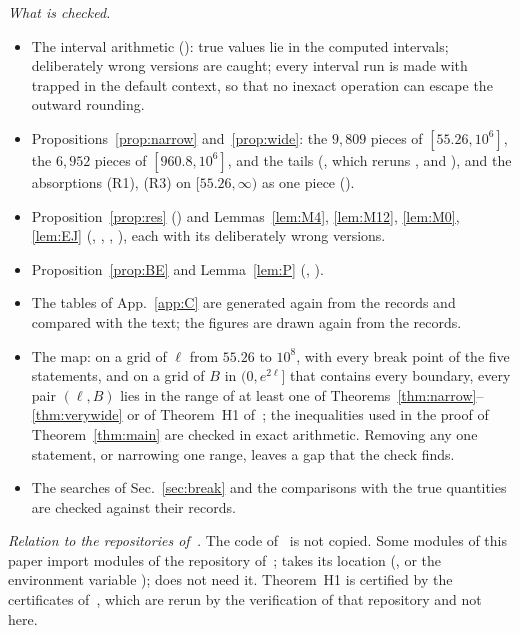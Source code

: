 \emph{What is checked.}
\begin{itemize}
\item[(i)] The interval arithmetic (): true values lie in the computed intervals; deliberately wrong versions are caught; every interval run is made with  trapped in the default context, so that no inexact operation can escape the outward rounding.
\item[(ii)] Propositions~\ref{prop:narrow} and~\ref{prop:wide}: the $9{,}809$ pieces of $[55.26,10^6]$, the $6{,}952$ pieces of $[960.8,10^6]$, and the tails (, which reruns ,  and ), and the absorptions (R1), (R3) on $[55.26,\infty)$ as one piece ().
\item[(iii)] Proposition~\ref{prop:res} () and Lemmas~\ref{lem:M4}, \ref{lem:M12}, \ref{lem:M0}, \ref{lem:EJ} (, , , ), each with its deliberately wrong versions.
\item[(iv)] Proposition~\ref{prop:BE} and Lemma~\ref{lem:P} (, ).
\item[(v)] The tables of App.~\ref{app:C} are generated again from the records and compared with the text; the figures are drawn again from the records.
\item[(vi)] The map: on a grid of $\ell$ from $55.26$ to $10^{8}$, with every break point of the five statements, and on a grid of $B$ in $(0,e^{2\ell}]$ that contains every boundary, every pair $(\ell,B)$ lies in the range of at least one of Theorems~\ref{thm:narrow}--\ref{thm:verywide} or of Theorem~H1 of~\cite{H}; the inequalities used in the proof of Theorem~\ref{thm:main} are checked in exact arithmetic. Removing any one statement, or narrowing one range, leaves a gap that the check finds.
\item[(vii)] The searches of Sec.~\ref{sec:break} and the comparisons with the true quantities are checked against their records.
\end{itemize}

\emph{Relation to the repositories of~\cite{F,H}.}
The code of~\cite{F,H} is not copied.
Some modules of this paper import modules of the repository of~\cite{H};  takes its location (, or the environment variable );  does not need it.
Theorem~H1 is certified by the certificates of~\cite{H}, which are rerun by the verification of that repository and not here.
